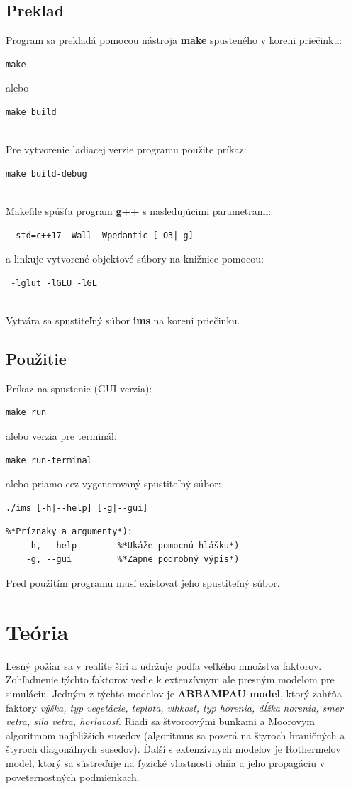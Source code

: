 \documentclass[a4paper,12pt]{article}
\begin{document}
\subsection{Preklad}
Program sa prekladá pomocou nástroja {\bf make} spusteného v koreni priečinku:
\begin{lstlisting}
make
\end{lstlisting}
alebo
\begin{lstlisting}
make build
\end{lstlisting}
\leavevmode\\
Pre vytvorenie ladiacej verzie programu použite príkaz:
\begin{lstlisting}
make build-debug
\end{lstlisting}
\leavevmode\\
Makefile spúšťa program \textbf{g++} s nasledujúcimi parametrami:
\begin{lstlisting}
--std=c++17 -Wall -Wpedantic [-O3|-g]
\end{lstlisting}
a linkuje vytvorené objektové súbory na knižnice pomocou:
\begin{lstlisting}
 -lglut -lGLU -lGL
\end{lstlisting}
\leavevmode\\
Vytvára sa spustiteľný súbor {\bf ims} na koreni priečinku.

\subsection{Použitie}
Príkaz na spustenie (GUI verzia):
\begin{lstlisting}
make run
\end{lstlisting}
alebo verzia pre terminál:
\begin{lstlisting}
make run-terminal
\end{lstlisting}
alebo priamo cez vygenerovaný spustiteľný súbor:
\begin{lstlisting}
./ims [-h|--help] [-g|--gui]
\end{lstlisting}
\begin{lstlisting}
%*Príznaky a argumenty*):
    -h, --help        %*Ukáže pomocnú hlášku*)
    -g, --gui         %*Zapne podrobný výpis*)
\end{lstlisting}
Pred použitím programu musí existovať jeho spustiteľný súbor.

\newpage
\section{Teória}
Lesný požiar sa v realite šíri a udržuje podľa veľkého množstva faktorov.
Zohľadnenie týchto faktorov vedie k extenzívnym ale presným modelom pre simuláciu.
Jedným z týchto modelov je \textbf{ABBAMPAU model}, ktorý zahŕňa faktory
\textit{výška, typ vegetácie, teplota, vlhkosť, typ horenia, dĺžka horenia,
smer vetra, sila vetra, horlavosť}.
Riadi sa štvorcovými bunkami a Moorovym algoritmom najbližších susedov
(algoritmus sa pozerá na štyroch hraničných a štyroch diagonálnych susedov).
Ďalší s extenzívnych modelov je Rothermelov model, ktorý sa sústreďuje na fyzické vlastnosti ohňa
a jeho propagáciu v poveternostných podmienkach.
\end{document}
